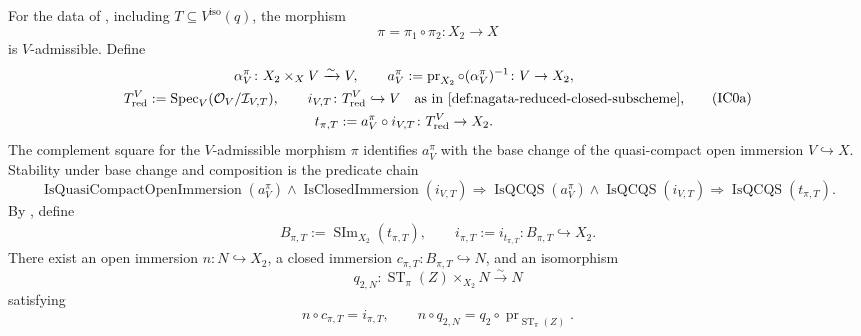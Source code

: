 \begin{lemma}
  \label{lemma:nagata-isomorphism-near-closure}
  \lean{}

  For the data of , including
  \(T\subseteq V^{\mathrm{iso}}(q)\), the morphism
  \[
    \pi=\pi_1\circ\pi_2\colon X_2\to X
  \]
  is \(V\)-admissible.  Define
  \[
  \begin{gathered}
    \alpha_V^\pi\colon X_2\times_XV\xrightarrow{\sim}V,\qquad
    a_V^\pi:=\operatorname{pr}_{X_2}\circ(\alpha_V^\pi)^{-1}
      \colon V\to X_2,\\
    T_{\mathrm{red}}^V
      :=\operatorname{Spec}_V(\mathcal O_V/\mathcal I_{V,T}),\qquad
    i_{V,T}\colon T_{\mathrm{red}}^V\hookrightarrow V
      \quad\text{as in
        \Cref{def:nagata-reduced-closed-subscheme}},\\
    t_{\pi,T}:=a_V^\pi\circ i_{V,T}
      \colon T_{\mathrm{red}}^V\to X_2.
  \end{gathered}                                                   \tag{IC0a}
  \]
  The complement square for the $V$-admissible morphism $\pi$ identifies
  $a_V^\pi$ with the base change of the quasi-compact open immersion
  $V\hookrightarrow X$.  Stability under base change and composition is the
  predicate chain
  \[
    \operatorname{IsQuasiCompactOpenImmersion}(a_V^\pi)
      \wedge\operatorname{IsClosedImmersion}(i_{V,T})
      \Longrightarrow
    \operatorname{IsQCQS}(a_V^\pi)
      \wedge\operatorname{IsQCQS}(i_{V,T})
      \Longrightarrow
    \operatorname{IsQCQS}(t_{\pi,T}).                             \tag{IC0b}
  \]
  By ,
  define
  \[
  \begin{gathered}
    B_{\pi,T}:=\operatorname{SIm}_{X_2}(t_{\pi,T}),\qquad
    i_{\pi,T}:=i_{t_{\pi,T}}\colon B_{\pi,T}\hookrightarrow X_2.
  \end{gathered}                                                   \tag{IC0}
  \]
  There exist an open immersion \(n\colon N\hookrightarrow X_2\), a closed
  immersion \(c_{\pi,T}\colon B_{\pi,T}\hookrightarrow N\), and an
  isomorphism
  \[
    q_{2,N}\colon
      \operatorname{ST}_\pi(Z)\times_{X_2}N\xrightarrow{\sim}N
  \]
  satisfying
  \[
    n\circ c_{\pi,T}=i_{\pi,T},\qquad
    n\circ q_{2,N}
      =q_2\circ\operatorname{pr}_{\operatorname{ST}_\pi(Z)}.       \tag{IC1}
  \]
\end{lemma}

